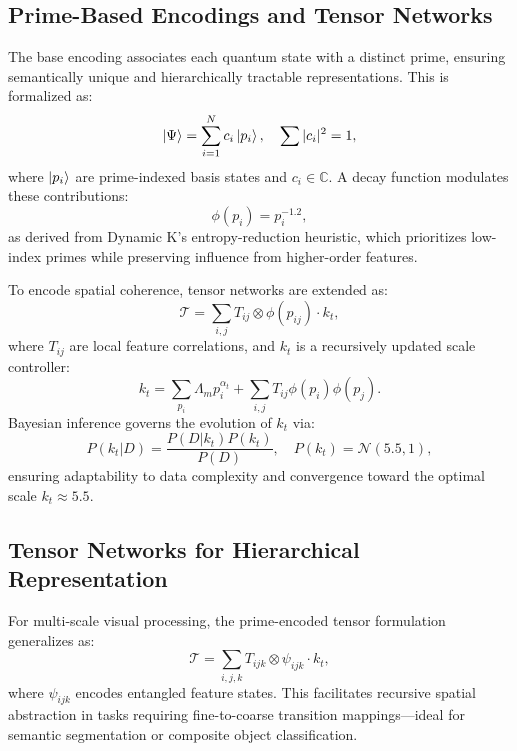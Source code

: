 \documentclass{article}
\theoremstyle{plain}
\begin{document}
\subsection{Prime-Based Encodings and Tensor Networks}
The base encoding associates each quantum state with a distinct prime, ensuring semantically unique and hierarchically tractable representations. This is formalized as:
\begin{equation}
\ket{\Psi} = \sum_{i=1}^{N} c_i \ket{p_i}, \quad \sum |c_i|^2 = 1,
\end{equation}
where \( \ket{p_i} \) are prime-indexed basis states and \( c_i \in \mathbb{C} \). A decay function modulates these contributions:
\begin{equation}
\phi(p_i) = p_i^{-1.2},
\end{equation}
as derived from Dynamic K’s entropy-reduction heuristic, which prioritizes low-index primes while preserving influence from higher-order features.

To encode spatial coherence, tensor networks are extended as:
\begin{equation}
\mathcal{T} = \sum_{i,j} T_{ij} \otimes \phi(p_{ij}) \cdot k_t,
\end{equation}
where \( T_{ij} \) are local feature correlations, and \( k_t \) is a recursively updated scale controller:
\begin{equation}
k_t = \sum_{p_i} \Lambda_m p_i^{\alpha_t} + \sum_{i,j} T_{ij} \phi(p_i) \phi(p_j).
\end{equation}
Bayesian inference governs the evolution of \( k_t \) via:
\begin{equation}
P(k_t | D) = \frac{P(D | k_t) P(k_t)}{P(D)}, \quad P(k_t) = \mathcal{N}(5.5, 1),
\end{equation}
ensuring adaptability to data complexity and convergence toward the optimal scale \( k_t \approx 5.5 \).

\subsection{Tensor Networks for Hierarchical Representation}
For multi-scale visual processing, the prime-encoded tensor formulation generalizes as:
\begin{equation}
\mathcal{T} = \sum_{i,j,k} T_{ijk} \otimes \psi_{ijk} \cdot k_t,
\end{equation}
where \( \psi_{ijk} \) encodes entangled feature states. This facilitates recursive spatial abstraction in tasks requiring fine-to-coarse transition mappings—ideal for semantic segmentation or composite object classification.
\end{document}
